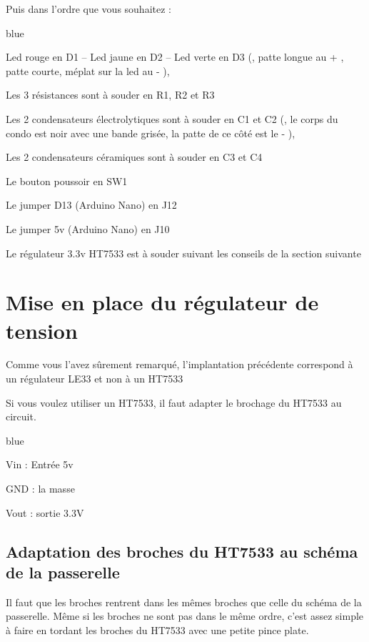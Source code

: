 Puis dans l'ordre que vous souhaitez : 
\begin{items}{blue}{\Triangle}
    \item Led rouge en D1 – Led jaune en D2 – Led verte en D3 (, patte longue au + ,  patte courte, méplat sur la led au - ),
    \item Les 3 résistances sont à souder en R1, R2 et R3
    \item Les 2 condensateurs électrolytiques sont à souder en C1 et C2 (, le corps du condo est noir avec une bande grisée, la patte de ce côté est le - ),
    \item Les 2 condensateurs céramiques sont à souder en C3 et C4
    \item Le bouton poussoir en SW1
    \item Le jumper D13 (Arduino Nano) en J12
    \item Le jumper 5v (Arduino Nano) en J10
    \item Le régulateur 3.3v HT7533 est à souder suivant les conseils de la section suivante
\end{items}

\section{Mise en place du régulateur de tension}

Comme vous l'avez sûrement remarqué, l'implantation précédente correspond à un régulateur LE33 et non à un HT7533

Si vous voulez utiliser un HT7533, il faut adapter le brochage du HT7533 au circuit.

\begin{items}{blue}{\Triangle}
    \item Vin : Entrée 5v
    \item GND : la masse
    \item Vout : sortie 3.3V
\end{items}


\subsection{Adaptation des broches du HT7533 au schéma de la passerelle}

Il faut que les broches  rentrent dans les mêmes broches que celle du schéma de la passerelle. Même si les broches ne sont pas dans le même ordre, c'est assez simple à faire en tordant les broches du HT7533 avec une petite pince plate.\\

